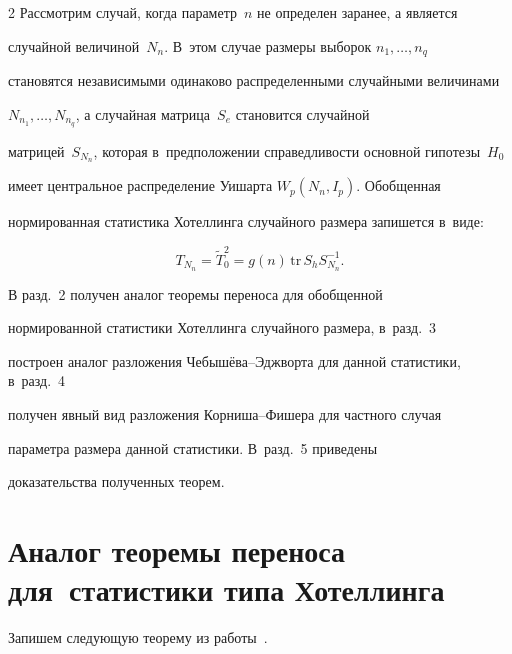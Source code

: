 \begin{multicols}{2}
Рассмотрим случай, когда параметр~$n$  не определен заранее, а является 


случайной величиной~$N_n$. В~этом случае размеры выборок $n_1, \ldots, n_q$ 


становятся независимыми одинаково распределенными случайными величинами 


$N_{n_1}, \ldots, N_{n_q}$, а случайная матрица~$S_e$ становится случайной 


матрицей~$S_{N_n}$, которая в~предположении справедливости основной гипотезы~$H_0$ 


имеет центральное распределение Уишарта $W_p(N_n, I_p)$. Обобщенная 


нормированная статистика Хотеллинга случайного размера запишется в~виде:


\begin{equation}


\label{r_hotel}


T_{N_n} = \widetilde{T}^2_0= g(n)\,\mathrm{tr}\,S_h S_{N_n}^{-1}.


\end{equation}





 В разд.~2 получен аналог теоремы переноса для обобщенной 


нормированной статистики Хотеллинга случайного размера, в~разд.~3 


построен аналог разложения Че\-бы\-шё\-ва--Эдж\-вор\-та для данной статистики, в~разд.~4 


получен явный вид разложения Кор\-ни\-ша--Фи\-ше\-ра для частного случая 


параметра размера данной статистики. В~разд.~5 приведены 


доказательства полученных тео\-рем.








\section{Аналог теоремы переноса для~статистики типа Хотеллинга}







Запишем следующую теорему из работы~\cite[теорема 4.1]{FUS05}.






\end{multicols}
